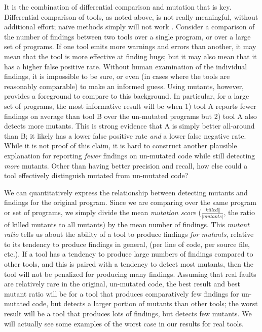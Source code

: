 It is the combination of differential comparison and mutation that is key.  Differential comparison of tools, as noted above, is not really meaningful, without additional effort; na\"ive methods simply will not work \cite{regehrRandom}.  Consider a comparison of the number of findings between two tools over a single program, or over a large set of programs.  If one tool emits more warnings and errors than another, it may mean that the tool is more effective at finding bugs; but it may also mean that it has a higher false positive rate.  Without human examination of the individual findings, it is impossible to be sure, or even (in cases where the tools are reasonably comparable) to make an informed guess.  Using mutants, however, provides a foreground to compare to this background.  In particular, for a large set of programs, the most informative result will be when 1) tool A reports fewer findings on average than tool B over the un-mutated programs but 2) tool A also detects more mutants.  This is strong evidence that A is simply better all-around than B; it likely has a lower false positive rate \emph{and} a lower false negative rate.  While it is not proof of this claim, it is hard to construct another plausible explanation for reporting \emph{fewer} findings on un-mutated code while still detecting \emph{more} mutants.  Other than having better precision and recall, how else could a tool effectively distinguish mutated from un-mutated code?

We can quantitatively express the relationship between detecting mutants and findings for the original program.  Since we are comparing over the same program or set of programs, we simply divide the mean \emph{mutation score} ($\frac{|\mathit{killed}||}{|\mathit{mutants}|}$, the ratio of killed mutants to all mutants) by the mean number of findings.  This \emph {mutant ratio} tells us about the ability of a tool to produce findings \emph{for mutants}, relative to its tendency to produce findings in general, (per line of code, per source file, etc.).  If a tool has a tendency to produce large numbers of findings compared to other tools, and this is paired with a tendency to detect most mutants, then the tool will not be penalized for producing many findings.  Assuming that real faults are relatively rare in the original, un-mutated code, the best result and best mutant ratio will be for a tool that produces comparatively few findings for un-mutated code, but detects a larger portion of mutants than other tools; the worst result will be a tool that produces lots of findings, but detects few mutants.  We will actually see some examples of the worst case in our results for real tools.

